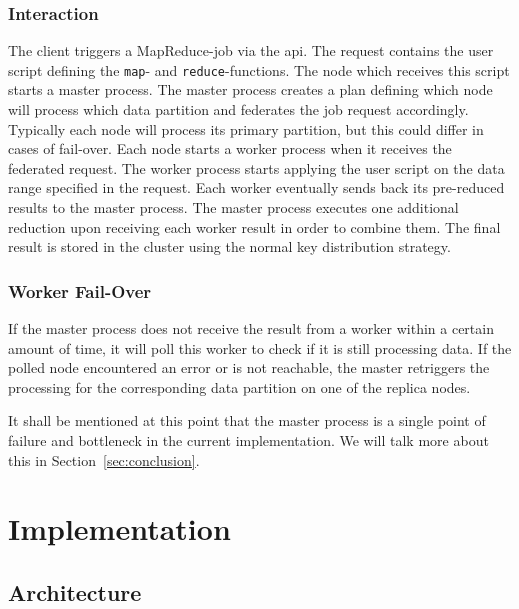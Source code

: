 \subsubsection{Interaction}
The client triggers a MapReduce-job via the \acs{api}.
The request contains the user script defining the \texttt{map}- and \texttt{reduce}-functions.  
The node which receives this script starts a master process.
The master process creates a plan defining which node will process which data partition and federates the job request accordingly.
Typically each node will process its primary partition, but this could differ in cases of fail-over. 
Each node starts a worker process when it receives the federated request.
The worker process starts applying the user script on the data range specified in the request.
Each worker eventually sends back its pre-reduced results to the master process.
The master process executes one additional reduction upon receiving each worker result
in order to combine them.
The final result is stored in the cluster using the normal key distribution strategy.

\subsubsection{Worker Fail-Over}
If the master process does not receive the result from a worker within a certain
amount of time, it will poll this worker to check if it is still processing data.
If the polled node encountered an error or is not reachable, the master retriggers
the processing for the corresponding data partition on one of the replica nodes.

It shall be mentioned at this point that the master process is a single point of failure and bottleneck
in the current implementation.
We will talk more about this in Section~\ref{sec:conclusion}.


\section{Implementation}
\label{sec:implementation}

\subsection{Architecture}

